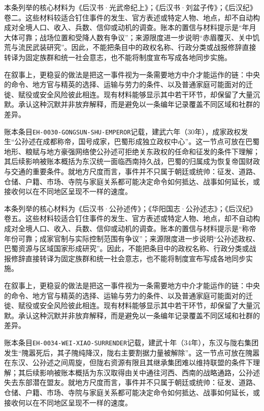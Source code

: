 本条列举的核心材料为《后汉书·光武帝纪上》；《后汉书·刘盆子传》；《后汉纪》卷二。这些材料较适合钉住事件的发生、官方表述或特定人物、地点，却不自动构成对全境人口、收入、兵数、信仰或动机的调查。账本的置信与材料提示是“年月大体可靠；战场位置和受降人数有争议”；来源限度进一步说明“赤眉覆灭、关中饥荒与流民武装研究”。因此，不能把条目中的政权名称、行政分类或战报修辞直接转译为固定族群和统一社会意志，也不能将制度宣布写成各地同步实施。

在叙事上，更稳妥的做法是把这一事件视为一条需要地方中介才能运作的链：中央的命令、地方官与精英的选择、运输与劳力的条件、以及普通家庭可能面对的迁徙、赋役或安全风险彼此相连。现有材料能够显示其中若干环节，却保留了大量沉默。承认这种沉默并非放弃解释，而是避免以一条编年记录覆盖不同区域和社群的差异。

账本条目\texttt{EH-0030-GONGSUN-SHU-EMPEROR}记载，建武六年（30年），成家政权发生“公孙述在成都称帝，国号成家，巴蜀形成独立政权中心”。这一节点可放在巴蜀地形、粮赋与地方豪强网络使公孙述可拒绝关东政权的任命和征发的条件下理解；其后续影响被账本概括为东汉统一面临西南持久战，巴蜀的归属成为恢复帝国财政与交通的重要条件。就地方尺度而言，事件并不只属于朝廷或统帅：征发、道路、仓储、户籍、市场、寺院与家庭关系都可能决定命令如何抵达、战事如何延长，或接收何以在不同地区呈现不一样的速度。

本条列举的核心材料为《后汉书·公孙述传》；《华阳国志·公孙述志》；《后汉纪》卷五。这些材料较适合钉住事件的发生、官方表述或特定人物、地点，却不自动构成对全境人口、收入、兵数、信仰或动机的调查。账本的置信与材料提示是“称帝年份可靠；成家官制与实际控制范围有争议”；来源限度进一步说明“公孙述政权、巴蜀资源与区域国家形成研究”。因此，不能把条目中的政权名称、行政分类或战报修辞直接转译为固定族群和统一社会意志，也不能将制度宣布写成各地同步实施。

在叙事上，更稳妥的做法是把这一事件视为一条需要地方中介才能运作的链：中央的命令、地方官与精英的选择、运输与劳力的条件、以及普通家庭可能面对的迁徙、赋役或安全风险彼此相连。现有材料能够显示其中若干环节，却保留了大量沉默。承认这种沉默并非放弃解释，而是避免以一条编年记录覆盖不同区域和社群的差异。

账本条目\texttt{EH-0034-WEI-XIAO-SURRENDER}记载，建武十年（34年），东汉与陇右集团发生“隗嚣死后，其子隗纯降汉，陇右主要割据力量被解除”。这一节点可放在隗嚣在东汉、公孙述之间周旋，但陇右资源有限且其继承集团难以维持联盟的条件下理解；其后续影响被账本概括为东汉取得由关中通往河西、西南的战略通路，公孙述失去东部潜在盟友。就地方尺度而言，事件并不只属于朝廷或统帅：征发、道路、仓储、户籍、市场、寺院与家庭关系都可能决定命令如何抵达、战事如何延长，或接收何以在不同地区呈现不一样的速度。


